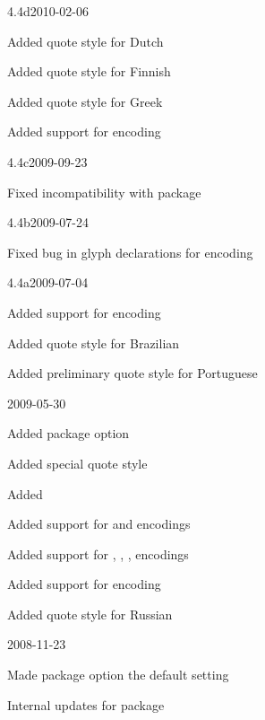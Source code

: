\documentclass{ltxdockit}[2010/09/26]
\begin{document}
\begin{changelog}
\begin{release}{4.4d}{2010-02-06}
\item Added quote style for Dutch
\item Added quote style for Finnish
\item Added quote style for Greek
\item Added support for  encoding
\end{release}

\begin{release}{4.4c}{2009-09-23}
\item Fixed incompatibility with  package
\end{release}

\begin{release}{4.4b}{2009-07-24}
\item Fixed bug in glyph declarations for  encoding
\end{release}

\begin{release}{4.4a}{2009-07-04}
\item Added support for  encoding
\item Added quote style for Brazilian
\item Added preliminary quote style for Portuguese
\end{release}

\begin{release}{4.4}{2009-05-30}
\item Added package option 
\item Added special quote style 
\item Added 
\item Added support for  and  encodings
\item Added support for , , ,  encodings
\item Added support for  encoding
\item Added quote style for Russian
\end{release}

\begin{release}{4.3}{2008-11-23}
\item Made package option  the default setting
\item Internal updates for  package
\end{release}


\end{changelog}
\end{document}
